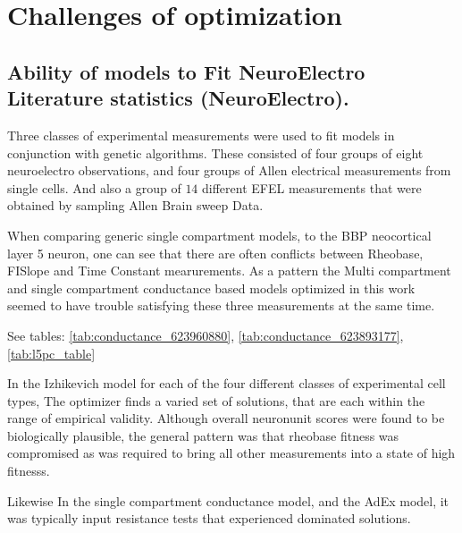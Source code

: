 \section{Challenges of optimization}

\subsection{Ability of models to Fit NeuroElectro Literature statistics (NeuroElectro).}
Three classes of experimental measurements were used to fit models in conjunction with genetic algorithms. These consisted of four groups of eight neuroelectro observations, and four groups of Allen electrical measurements from single cells. And also a group of  $14$ different EFEL measurements that were obtained by sampling Allen Brain sweep Data.

When comparing generic single compartment models, to the BBP neocortical layer 5 neuron, one can see that there are often conflicts between Rheobase, FISlope and Time Constant mearurements. As a pattern the Multi compartment and single compartment conductance based models optimized in this work seemed to have trouble satisfying these three measurements at the same time.

See tables: \ref{tab:conductance_623960880}, \ref{tab:conductance_623893177}, \ref{tab:l5pc_table}




In the Izhikevich model for each of the four different classes of experimental cell types, The optimizer finds a varied set of solutions, that are each within the range of empirical validity. Although overall neuronunit scores were found to be biologically plausible, the general pattern was that rheobase fitness was compromised as was required to bring all other measurements into a state of high fitnesss. %

Likewise In the single compartment conductance model, and the AdEx model, it was typically input resistance tests that experienced dominated solutions. 

